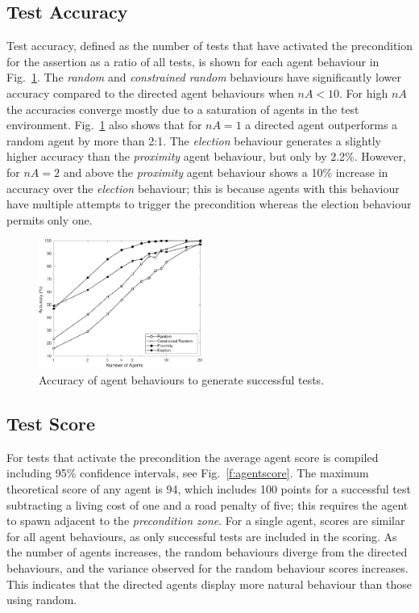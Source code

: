 \documentclass[letterpaper, 10 pt, journal, twoside]{IEEEtran}
\begin{document}
\subsection{Test Accuracy}
Test accuracy, defined as the number of tests that have activated the precondition for the assertion as a ratio of all tests, is shown for each agent behaviour in Fig.~\ref{f:accuracy}. The \textit{random} and \textit{constrained random} behaviours have significantly lower accuracy compared to the directed agent behaviours when $nA<10$. For high $nA$ the accuracies converge mostly due to a saturation of agents in the test environment.
%
Fig.~\ref{f:accuracy} also shows that for $nA=1$ a directed agent outperforms a random agent by more than 2:1. The \textit{election} behaviour generates a slightly higher accuracy than the \textit{proximity} agent behaviour, but only by 2.2\%. However, for $nA=2$ and above the \textit{proximity} agent behaviour shows a 10\% increase in accuracy over the \textit{election} behaviour; this is because agents with this behaviour have multiple attempts to trigger the precondition whereas the election behaviour permits only one. 

\begin{figure}[!t]
	\centering
\includegraphics[width=0.48\textwidth]{Accuracy.pdf}
	\caption{Accuracy of agent behaviours to generate successful tests.}
	\label{f:accuracy}
\end{figure}

\subsection{Test Score} \label{s:testscore}

For tests that activate the precondition the average agent score is compiled including 95\% confidence intervals, see Fig.~\ref{f:agentscore}. The maximum theoretical score of any agent is 94, which includes 100 points for a successful test subtracting a living cost of one and a road penalty of five; this requires the agent to spawn adjacent to the \textit{precondition zone}. 
For a single agent, scores are similar for all agent behaviours, as only successful tests are included in the scoring. As the number of agents increases, the random behaviours diverge from the directed behaviours, and the variance observed for the random behaviour scores increases. This indicates that the directed agents display more natural behaviour than those using random.
\end{document}
